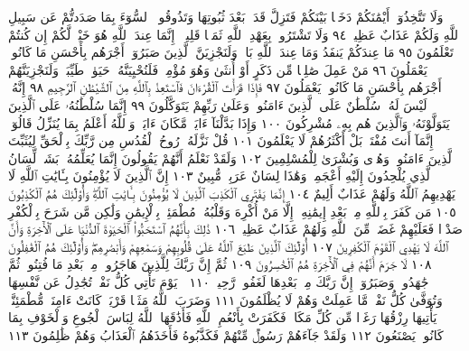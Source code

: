 وَلَا تَتَّخِذُوٓا۟ أَيْمَٰنَكُمْ دَخَلَۢا بَيْنَكُمْ فَتَزِلَّ قَدَمُۢ بَعْدَ
ثُبُوتِهَا وَتَذُوقُوا۟ ٱلسُّوٓءَ بِمَا صَدَدتُّمْ عَن سَبِيلِ ٱللَّهِ وَلَكُمْ
عَذَابٌ عَظِيمࣱ ٩٤ وَلَا تَشْتَرُوا۟ بِعَهْدِ ٱللَّهِ ثَمَنࣰا قَلِيلًاۚ إِنَّمَا
عِندَ ٱللَّهِ هُوَ خَيْرࣱ لَّكُمْ إِن كُنتُمْ تَعْلَمُونَ ٩٥ مَا عِندَكُمْ
يَنفَدُ وَمَا عِندَ ٱللَّهِ بَاقࣲۗ وَلَنَجْزِيَنَّ ٱلَّذِينَ صَبَرُوٓا۟ أَجْرَهُم
بِأَحْسَنِ مَا كَانُوا۟ يَعْمَلُونَ ٩٦ مَنْ عَمِلَ صَٰلِحࣰا
مِّن ذَكَرٍ أَوْ أُنثَىٰ وَهُوَ مُؤْمِنࣱ فَلَنُحْيِيَنَّهُۥ حَيَوٰةࣰ طَيِّبَةࣰۖ
وَلَنَجْزِيَنَّهُمْ أَجْرَهُم بِأَحْسَنِ مَا كَانُوا۟ يَعْمَلُونَ ٩٧
فَإِذَا قَرَأْتَ ٱلْقُرْءَانَ فَٱسْتَعِذْ بِٱللَّهِ مِنَ ٱلشَّيْطَٰنِ ٱلرَّجِيمِ ٩٨
إِنَّهُۥ لَيْسَ لَهُۥ سُلْطَٰنٌ عَلَى ٱلَّذِينَ ءَامَنُوا۟ وَعَلَىٰ رَبِّهِمْ
يَتَوَكَّلُونَ ٩٩ إِنَّمَا سُلْطَٰنُهُۥ عَلَى ٱلَّذِينَ يَتَوَلَّوْنَهُۥ وَٱلَّذِينَ
هُم بِهِۦ مُشْرِكُونَ ١٠٠ وَإِذَا بَدَّلْنَآ ءَايَةࣰ مَّكَانَ ءَايَةࣲ
وَٱللَّهُ أَعْلَمُ بِمَا يُنَزِّلُ قَالُوٓا۟ إِنَّمَآ أَنتَ مُفْتَرِۭۚ بَلْ أَكْثَرُهُمْ
لَا يَعْلَمُونَ ١٠١ قُلْ نَزَّلَهُۥ رُوحُ ٱلْقُدُسِ مِن رَّبِّكَ بِٱلْحَقِّ
لِيُثَبِّتَ ٱلَّذِينَ ءَامَنُوا۟ وَهُدࣰى وَبُشْرَىٰ لِلْمُسْلِمِينَ ١٠٢
وَلَقَدْ نَعْلَمُ أَنَّهُمْ يَقُولُونَ إِنَّمَا يُعَلِّمُهُۥ بَشَرࣱۗ لِّسَانُ
ٱلَّذِي يُلْحِدُونَ إِلَيْهِ أَعْجَمِيࣱّ وَهَٰذَا لِسَانٌ عَرَبِيࣱّ مُّبِينٌ ١٠٣
إِنَّ ٱلَّذِينَ لَا يُؤْمِنُونَ بِـَٔايَٰتِ ٱللَّهِ لَا يَهْدِيهِمُ ٱللَّهُ
وَلَهُمْ عَذَابٌ أَلِيمٌ ١٠٤ إِنَّمَا يَفْتَرِي ٱلْكَذِبَ ٱلَّذِينَ
لَا يُؤْمِنُونَ بِـَٔايَٰتِ ٱللَّهِۖ وَأُو۟لَٰٓئِكَ هُمُ ٱلْكَٰذِبُونَ ١٠٥
مَن كَفَرَ بِٱللَّهِ مِنۢ بَعْدِ إِيمَٰنِهِۦٓ إِلَّا مَنْ أُكْرِهَ وَقَلْبُهُۥ
مُطْمَئِنُّۢ بِٱلْإِيمَٰنِ وَلَٰكِن مَّن شَرَحَ بِٱلْكُفْرِ
صَدْرࣰا فَعَلَيْهِمْ غَضَبࣱ مِّنَ ٱللَّهِ وَلَهُمْ عَذَابٌ عَظِيمࣱ ١٠٦
ذَٰلِكَ بِأَنَّهُمُ ٱسْتَحَبُّوا۟ ٱلْحَيَوٰةَ ٱلدُّنْيَا عَلَى
ٱلْأٓخِرَةِ وَأَنَّ ٱللَّهَ لَا يَهْدِي ٱلْقَوْمَ ٱلْكَٰفِرِينَ ١٠٧
أُو۟لَٰٓئِكَ ٱلَّذِينَ طَبَعَ ٱللَّهُ عَلَىٰ قُلُوبِهِمْ وَسَمْعِهِمْ
وَأَبْصَٰرِهِمْۖ وَأُو۟لَٰٓئِكَ هُمُ ٱلْغَٰفِلُونَ ١٠٨ لَا جَرَمَ
أَنَّهُمْ فِي ٱلْأٓخِرَةِ هُمُ ٱلْخَٰسِرُونَ ١٠٩ ثُمَّ إِنَّ رَبَّكَ
لِلَّذِينَ هَاجَرُوا۟ مِنۢ بَعْدِ مَا فُتِنُوا۟ ثُمَّ جَٰهَدُوا۟
وَصَبَرُوٓا۟ إِنَّ رَبَّكَ مِنۢ بَعْدِهَا لَغَفُورࣱ رَّحِيمࣱ ١١٠
۞ يَوْمَ تَأْتِي كُلُّ نَفْسࣲ تُجَٰدِلُ عَن نَّفْسِهَا وَتُوَفَّىٰ كُلُّ
نَفْسࣲ مَّا عَمِلَتْ وَهُمْ لَا يُظْلَمُونَ ١١١ وَضَرَبَ ٱللَّهُ مَثَلࣰا
قَرْيَةࣰ كَانَتْ ءَامِنَةࣰ مُّطْمَئِنَّةࣰ يَأْتِيهَا رِزْقُهَا رَغَدࣰا مِّن
كُلِّ مَكَانࣲ فَكَفَرَتْ بِأَنْعُمِ ٱللَّهِ فَأَذَٰقَهَا ٱللَّهُ لِبَاسَ
ٱلْجُوعِ وَٱلْخَوْفِ بِمَا كَانُوا۟ يَصْنَعُونَ ١١٢ وَلَقَدْ جَآءَهُمْ
رَسُولࣱ مِّنْهُمْ فَكَذَّبُوهُ فَأَخَذَهُمُ ٱلْعَذَابُ وَهُمْ ظَٰلِمُونَ ١١٣
